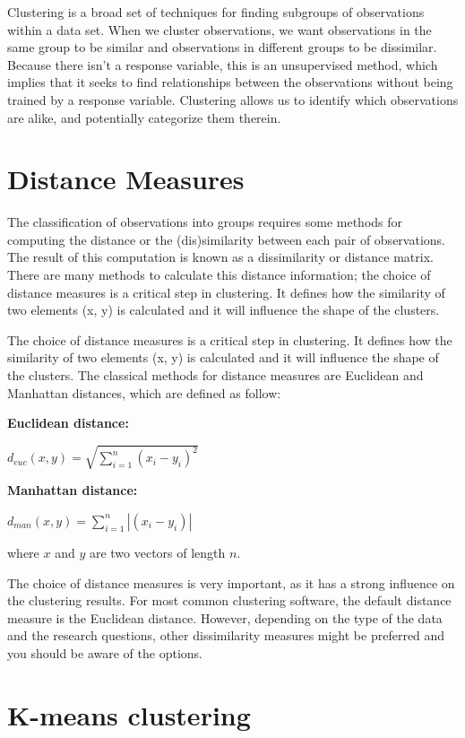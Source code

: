 \documentclass[]{book}
\begin{document}
Clustering is a broad set of techniques for finding subgroups of observations within a data set. When we cluster observations, we want observations in the same group to be similar and observations in different groups to be dissimilar. Because there isn't a response variable, this is an unsupervised method, which implies that it seeks to find relationships between the observations without being trained by a response variable. Clustering allows us to identify which observations are alike, and potentially categorize them therein.

\hypertarget{distance-measures}{%
\section{Distance Measures}\label{distance-measures}}

The classification of observations into groups requires some methods for computing the distance or the (dis)similarity between each pair of observations. The result of this computation is known as a dissimilarity or distance matrix. There are many methods to calculate this distance information; the choice of distance measures is a critical step in clustering. It defines how the similarity of two elements (x, y) is calculated and it will influence the shape of the clusters.

The choice of distance measures is a critical step in clustering. It defines how the similarity of two elements (x, y) is calculated and it will influence the shape of the clusters. The classical methods for distance measures are Euclidean and Manhattan distances, which are defined as follow:

\textbf{Euclidean distance:}

\(d_{euc}(x,y) = \sqrt{\sum^n_{i=1}(x_i - y_i)^2}\)

\textbf{Manhattan distance:}

\(d_{man}(x,y) = \sum^n_{i=1}|(x_i - y_i)|\)

where \(x\) and \(y\) are two vectors of length \(n\).

The choice of distance measures is very important, as it has a strong influence on the clustering results. For most common clustering software, the default distance measure is the Euclidean distance. However, depending on the type of the data and the research questions, other dissimilarity measures might be preferred and you should be aware of the options.

\hypertarget{k-means-clustering}{%
\section{K-means clustering}\label{k-means-clustering}}
\end{document}
